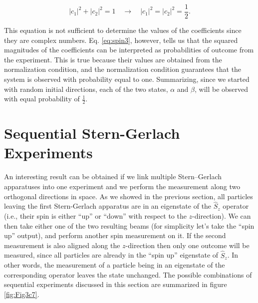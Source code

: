 \documentclass[
  english,
  9pt,
]{extbook}
\theoremstyle{definition}
\theoremstyle{definition}
\theoremstyle{definition}
\theoremstyle{definition}
\theoremstyle{remark}
\begin{document}
\begin{equation}
|c_{1}|^{2}+|c_{2}|^{2}=1 \quad\longrightarrow\quad |c_{1}|^{2}=|c_{2}|^{2}=\frac{1}{2}.
\label{eq:spin3}    
\end{equation}

This equation is not sufficient to determine the values of the coefficients since they are complex numbers. Eq. \eqref{eq:spin3}, however, tells us that the squared magnitudes of the coefficients can be interpreted as probabilities of outcome from the experiment. This is true because their values are obtained from the normalization condition, and the normalization condition guarantees that the system is observed with probability equal to one. Summarizing, since we started with random initial directions, each of the two states, \(\alpha\) and \(\beta\), will be observed with equal probability of \(\frac{1}{2}\).

\section{Sequential Stern-Gerlach Experiments}\label{sequential-stern-gerlach-experiments}

An interesting result can be obtained if we link multiple Stern--Gerlach apparatuses into one experiment and we perform the measurement along two orthogonal directions in space.
As we showed in the previous section, all particles leaving the first Stern-Gerlach apparatus are in an eigenstate of the \(\hat{S}_z\) operator (i.e., their spin is either ``up'' or ``down'' with respect to the \(z\)-direction). We can then take either one of the two resulting beams (for simplicity let's take the ``spin up'' output), and perform another spin measurement on it. If the second measurement is also aligned along the \(z\)-direction then only one outcome will be measured, since all particles are already in the ``spin up'' eigenstate of \(\hat{S}_z\). In other words, the measurement of a particle being in an eigenstate of the corresponding operator leaves the state unchanged. The possible combinations of sequential experiments discussed in this section are summarized in figure \ref{fig:Fig3c7}.
\end{document}
